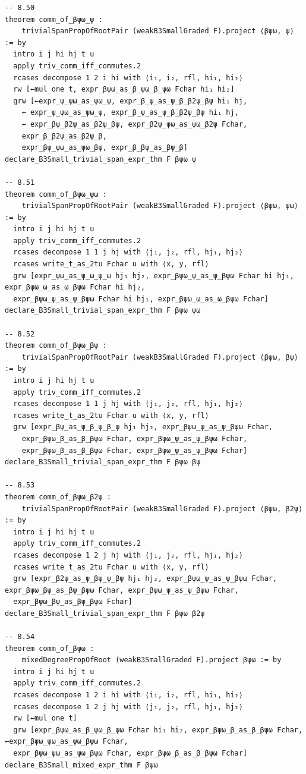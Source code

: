 \documentclass[10pt,a4paper]{article}
\begin{document}
\begin{Verbatim}
-- 8.50
theorem comm_of_βψω_ψ :
    trivialSpanPropOfRootPair (weakB3SmallGraded F).project ⟨βψω, ψ⟩ := by
  intro i j hi hj t u
  apply triv_comm_iff_commutes.2
  rcases decompose 1 2 i hi with ⟨i₁, i₂, rfl, hi₁, hi₂⟩
  rw [←mul_one t, expr_βψω_as_β_ψω_β_ψω Fchar hi₁ hi₂]
  grw [←expr_ψ_ψω_as_ψω_ψ, expr_β_ψ_as_ψ_β_β2ψ_βψ hi₁ hj,
    ← expr_ψ_ψω_as_ψω_ψ, expr_β_ψ_as_ψ_β_β2ψ_βψ hi₁ hj,
    ← expr_βψ_β2ψ_as_β2ψ_βψ, expr_β2ψ_ψω_as_ψω_β2ψ Fchar,
    expr_β_β2ψ_as_β2ψ_β,
    expr_βψ_ψω_as_ψω_βψ, expr_β_βψ_as_βψ_β]
declare_B3Small_trivial_span_expr_thm F βψω ψ

-- 8.51
theorem comm_of_βψω_ψω :
    trivialSpanPropOfRootPair (weakB3SmallGraded F).project ⟨βψω, ψω⟩ := by
  intro i j hi hj t u
  apply triv_comm_iff_commutes.2
  rcases decompose 1 1 j hj with ⟨j₁, j₂, rfl, hj₁, hj₂⟩
  rcases write_t_as_2tu Fchar u with ⟨x, y, rfl⟩
  grw [expr_ψω_as_ψ_ω_ψ_ω hj₁ hj₂, expr_βψω_ψ_as_ψ_βψω Fchar hi hj₁, expr_βψω_ω_as_ω_βψω Fchar hi hj₂,
  expr_βψω_ψ_as_ψ_βψω Fchar hi hj₁, expr_βψω_ω_as_ω_βψω Fchar]
declare_B3Small_trivial_span_expr_thm F βψω ψω

-- 8.52
theorem comm_of_βψω_βψ :
    trivialSpanPropOfRootPair (weakB3SmallGraded F).project ⟨βψω, βψ⟩ := by
  intro i j hi hj t u
  apply triv_comm_iff_commutes.2
  rcases decompose 1 1 j hj with ⟨j₁, j₂, rfl, hj₁, hj₂⟩
  rcases write_t_as_2tu Fchar u with ⟨x, y, rfl⟩
  grw [expr_βψ_as_ψ_β_ψ_β_ψ hj₁ hj₂, expr_βψω_ψ_as_ψ_βψω Fchar,
    expr_βψω_β_as_β_βψω Fchar, expr_βψω_ψ_as_ψ_βψω Fchar,
    expr_βψω_β_as_β_βψω Fchar, expr_βψω_ψ_as_ψ_βψω Fchar]
declare_B3Small_trivial_span_expr_thm F βψω βψ

-- 8.53
theorem comm_of_βψω_β2ψ :
    trivialSpanPropOfRootPair (weakB3SmallGraded F).project ⟨βψω, β2ψ⟩ := by
  intro i j hi hj t u
  apply triv_comm_iff_commutes.2
  rcases decompose 1 2 j hj with ⟨j₁, j₂, rfl, hj₁, hj₂⟩
  rcases write_t_as_2tu Fchar u with ⟨x, y, rfl⟩
  grw [expr_β2ψ_as_ψ_βψ_ψ_βψ hj₁ hj₂, expr_βψω_ψ_as_ψ_βψω Fchar, expr_βψω_βψ_as_βψ_βψω Fchar, expr_βψω_ψ_as_ψ_βψω Fchar,
  expr_βψω_βψ_as_βψ_βψω Fchar]
declare_B3Small_trivial_span_expr_thm F βψω β2ψ

-- 8.54
theorem comm_of_βψω :
    mixedDegreePropOfRoot (weakB3SmallGraded F).project βψω := by
  intro i j hi hj t u
  apply triv_comm_iff_commutes.2
  rcases decompose 1 2 i hi with ⟨i₁, i₂, rfl, hi₁, hi₂⟩
  rcases decompose 1 2 j hj with ⟨j₁, j₂, rfl, hj₁, hj₂⟩
  rw [←mul_one t]
  grw [expr_βψω_as_β_ψω_β_ψω Fchar hi₁ hi₂, expr_βψω_β_as_β_βψω Fchar, ←expr_βψω_ψω_as_ψω_βψω Fchar,
  expr_βψω_ψω_as_ψω_βψω Fchar, expr_βψω_β_as_β_βψω Fchar]
declare_B3Small_mixed_expr_thm F βψω


\end{Verbatim}
\end{document}
